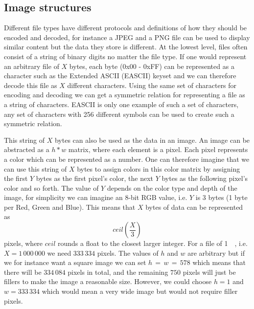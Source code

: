 \subsection{Image structures}
Different file types have different protocols and definitions of how they should be encoded and decoded, for instance a JPEG and a PNG file can be used to display similar content but the data they store is different. At the lowest level, files often consist of a string of binary digits no matter the file type. If one would represent an arbitrary file of $X$ bytes, each byte (0x00 - 0xFF) can be represented as a character such as the Extended ASCII (EASCII) keyset and we can therefore decode this file as $X$ different characters. Using the same set of characters for encoding and decoding we can get a symmetric relation for representing a file as a string of characters. EASCII is only one example of such a set of characters, any set of characters with 256 different symbols can be used to create such a symmetric relation.

This string of $X$ bytes can also be used as the data in an image. An image can be abstracted as a $h * w$ matrix, where each element is a pixel. Each pixel represents a color which can be represented as a number. One can therefore imagine that we can use this string of $X$ bytes to assign colors in this color matrix by assigning the first $Y$ bytes as the first pixel's color, the next $Y$ bytes as the following pixel's color and so forth. The value of $Y$ depends on the color type and depth of the image, for simplicity we can imagine an 8-bit RGB value, i.e. $Y$ is 3 bytes (1 byte per Red, Green and Blue). This means that $X$ bytes of data can be represented as 
$$ceil(\frac{X}{3})$$ 
pixels, where $ceil$ rounds a float to the closest larger integer. For a file of \SI{1}{\mega\byte}, i.e. $X = 1\,000\,000$ we need $333\,334$ pixels. The values of $h$ and $w$ are arbitrary but if we for instance want a square image we can set $ h\,=\,w\,=\,578$ which means that there will be $334\,084$ pixels in total, and the remaining $750$ pixels will just be fillers to make the image a reasonable size. However, we could choose $h = 1$ and $w = 333\,334$ which would mean a very wide image but would not require filler pixels.